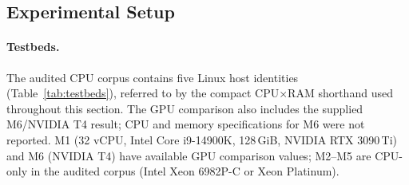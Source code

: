 \documentclass[sigconf, review, anonymous, balance=false]{acmart}
\newcommand{\ourmethod}{\textsc{BenchScout}\xspace}
\newcommand{\ptscpu}{PTS-CPU}
\newcommand{\ptsgpu}{PTS-GPU}
\newcommand{\appname}{BenchScout}
\begin{document}
\subsection{Experimental Setup}
\label{subsec:exp-setup}





\paragraph{Testbeds.}
The audited CPU corpus contains five Linux host identities (Table~\ref{tab:testbeds}), referred to by the compact CPU$\times$RAM shorthand used throughout this section. The GPU comparison also includes the supplied M6/NVIDIA T4 result; CPU and memory specifications for M6 were not reported.
M1 (32 vCPU, Intel Core i9-14900K, 128\,GiB, NVIDIA RTX 3090\,Ti) and M6 (NVIDIA T4) have available GPU comparison values; M2--M5 are CPU-only in the audited corpus (Intel Xeon 6982P-C or Xeon Platinum).
\end{document}
